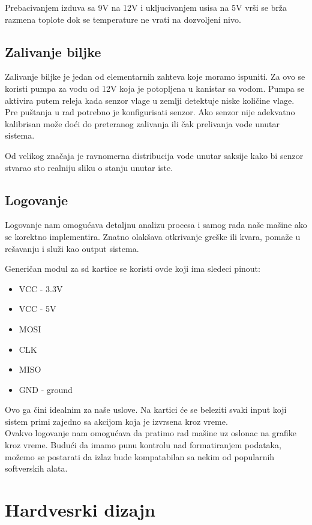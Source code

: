 \documentclass[a4paper,11pt]{book}
\begin{document}
\noindent Prebacivanjem izduva sa 9V na 12V i ukljucivanjem usisa na 5V vrši se brža razmena toplote dok se temperature ne vrati na dozvoljeni nivo. 

\subsection{Zalivanje biljke}
Zalivanje biljke je jedan od elementarnih zahteva koje moramo ispuniti. Za ovo se koristi pumpa za vodu od 12V koja je potopljena u kanistar sa vodom. Pumpa se aktivira putem releja kada senzor vlage u zemlji detektuje niske količine vlage. Pre puštanja u rad potrebno je konfigurisati senzor. Ako senzor nije adekvatno kalibrisan može doći do preteranog zalivanja ili čak prelivanja vode unutar sistema.

\noindent Od velikog značaja je ravnomerna distribucija vode unutar saksije kako bi senzor stvarao sto realniju sliku o stanju unutar iste.



\subsection{Logovanje}
Logovanje nam omogućava detaljnu analizu procesa i samog rada naše mašine ako se korektno implementira. Znatno olakšava otkrivanje greške ili kvara, pomaže u rešavanju i služi kao output sistema. 

Generičan modul za sd kartice se koristi ovde koji ima sledeci pinout:

\hrulefill
\begin{itemize}
  \item VCC - 3.3V
  \item VCC - 5V
  \item MOSI
  \item CLK 
  \item MISO
  \item GND - ground
\end{itemize}
\hrulefill

Ovo ga čini idealnim za naše uslove. Na kartici će se beleziti svaki input koji sistem primi zajedno sa akcijom koja je izvrsena kroz vreme. \\

Ovakvo logovanje nam omogućava da pratimo rad mašine uz oslonac na grafike kroz vreme. Budući da imamo punu kontrolu nad formatiranjem podataka, možemo se postarati da izlaz bude kompatabilan sa nekim od popularnih softverskih alata. 

\section{Hardvesrki dizajn}
\end{document}
